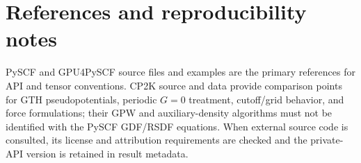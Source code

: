 \section{References and reproducibility notes}

PySCF and GPU4PySCF source files and examples are the primary references for
API and tensor conventions.  CP2K source and data provide comparison points
for GTH pseudopotentials, periodic $G=0$ treatment, cutoff/grid behavior, and
force formulations; their GPW and auxiliary-density algorithms must not be
identified with the PySCF GDF/RSDF equations.  When external source code is
consulted, its license and attribution requirements are checked and the
private-API version is retained in result metadata.
